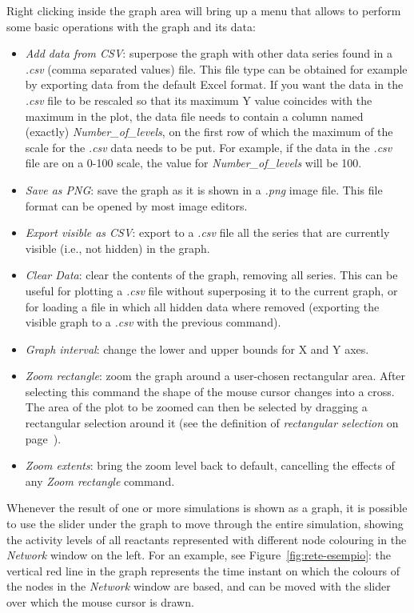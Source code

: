 Right clicking inside the graph area will bring up a menu that allows to perform some basic operations with the graph
and its data:
\begin{itemize}
  \item \emph{Add data from CSV}: \label{csv-import-format}superpose the graph with other data series found in a \emph{.csv} (comma separated values) file. This file type can be
obtained for example by exporting data from the default Excel format. If you want the data in the \emph{.csv} file to be rescaled so
that its maximum Y value coincides with the maximum in the plot, the data file needs to contain a column named (exactly)
\emph{Number\_{}of\_{}levels}, on the first row of which the maximum of the scale for the \emph{.csv} data needs to be put. For example,
if the data in the \emph{.csv} file are on a 0-100 scale, the value for \emph{Number\_{}of\_{}levels} will be 100.
  \item \emph{Save as PNG}: save the graph as it is shown in a \emph{.png} image file. This file format can be opened by most
image editors.
  \item \emph{Export visible as CSV}: export to a \emph{.csv} file all the series that are currently visible (i.e., not hidden)
in the graph.
  \item \emph{Clear Data}: clear the contents of the graph, removing all series. This can be useful for plotting
a \emph{.csv} file without superposing it to the current graph, or for loading a file in which all hidden data where removed
(exporting the visible graph to a \emph{.csv} with the previous command).
  \item \emph{Graph interval}: change the lower and upper bounds for X and Y axes.
  \item \emph{Zoom rectangle}: zoom the graph around a user-chosen rectangular area.
    After selecting this command the shape of the mouse cursor changes into a cross. The area of the plot to be
    zoomed can then be selected by dragging a rectangular selection around it (see the definition of \emph{rectangular
    selection} on page~\pageref{nota:rectangular-selection}).
  \item \emph{Zoom extents}: bring the zoom level back to default, cancelling the effects of any \emph{Zoom rectangle}
command.
\end{itemize}

Whenever the result of one or more simulations is shown as a graph, it is possible to use the slider under the graph to
move through the entire simulation, showing the activity levels of all reactants represented with different node colouring in
the \emph{Network} window on the left. For an example, see Figure~\ref{fig:rete-esempio}: the vertical red line in the
graph represents the time instant on which the colours of the nodes in the \emph{Network} window are based, and can
be moved with the slider over which the mouse cursor is drawn.





